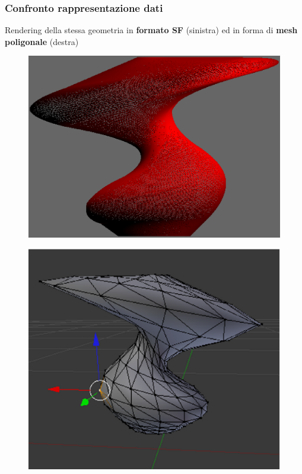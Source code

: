 \documentclass[ignorenonframetext,8pt]{beamer}
\begin{document}
	\begin{frame}
		\frametitle{Confronto rappresentazione dati}
		\begin{block}{Rendering della stessa geometria in \textbf{formato SF} (sinistra) ed in forma di \textbf{mesh poligonale} (destra)}
			\begin{center}
				\begin{minipage}[c]{.45\textwidth}
					\begin{figure}
						\includegraphics[width=\textwidth]{Immagini/fungoSF}
					\end{figure}
				\end{minipage}
				\begin{minipage}[c]{.45\textwidth}
					\begin{figure}
						\includegraphics[width=\textwidth]{Immagini/fungoObj}

\end{figure}
\end{minipage}
\end{center}
\end{block}
\end{frame}
\end{document}
